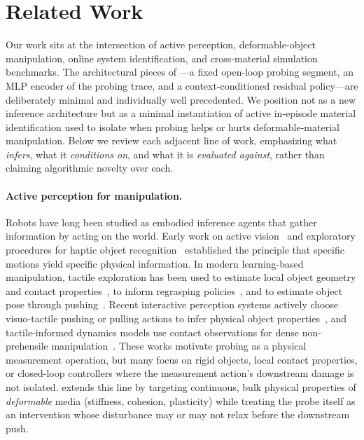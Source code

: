 \section{Related Work}
\label{sec:related}

Our work sits at the intersection of active perception, deformable-object manipulation, online system identification, and cross-material simulation benchmarks. The architectural pieces of \PTA{}---a fixed open-loop probing segment, an MLP encoder of the probing trace, and a context-conditioned residual policy---are deliberately minimal and individually well precedented. We position \PTA{} not as a new inference architecture but as a minimal instantiation of active in-episode material identification used to isolate when probing helps or hurts deformable-material manipulation. Below we review each adjacent line of work, emphasizing what \PTA{} \emph{infers}, what it \emph{conditions on}, and what it is \emph{evaluated against}, rather than claiming algorithmic novelty over each.

\paragraph{Active perception for manipulation.}
Robots have long been studied as embodied inference agents that gather information by acting on the world. Early work on active vision~\cite{bajcsy1988active} and exploratory procedures for haptic object recognition~\cite{lederman1987hand} established the principle that specific motions yield specific physical information. In modern learning-based manipulation, tactile exploration has been used to estimate local object geometry and contact properties~\cite{calandra2018more,xu2013tactile}, to inform regrasping policies~\cite{bauza2020tactile}, and to estimate object pose through pushing~\cite{yu2016more,bauza2018data}. Recent interactive perception systems actively choose visuo-tactile pushing or pulling actions to infer physical object properties~\cite{dutta2025predictive}, and tactile-informed dynamics models use contact observations for dense non-prehensile manipulation~\cite{ai2024robopack}. These works motivate probing as a physical measurement operation, but many focus on rigid objects, local contact properties, or closed-loop controllers where the measurement action's downstream damage is not isolated. \PTA{} extends this line by targeting continuous, bulk physical properties of \emph{deformable} media (stiffness, cohesion, plasticity) while treating the probe itself as an intervention whose disturbance may or may not relax before the downstream push.

